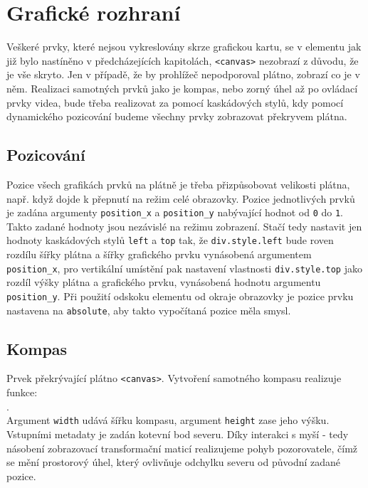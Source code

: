 \section{Grafické rozhraní}
Veškeré prvky, které nejsou vykreslovány skrze grafickou kartu, se v elementu jak již bylo nastíněno v předcházejících kapitolách, \texttt{<canvas>} nezobrazí z důvodu, že je vše skryto. Jen v případě, že by prohlížeč nepodporoval plátno, zobrazí co je v něm. Realizaci samotných prvků jako je kompas, nebo zorný úhel až po ovládací prvky videa, bude třeba realizovat za pomocí kaskádových stylů, kdy pomocí dynamického pozicování budeme všechny prvky zobrazovat překryvem plátna.

\subsection*{Pozicování}
Pozice všech grafikách prvků na plátně je třeba přizpůsobovat velikosti plátna, např. když dojde k přepnutí na režim celé obrazovky. Pozice jednotlivých prvků je zadána argumenty \texttt{position\_x} a \texttt{position\_y} nabývající hodnot od \texttt{0} do \texttt{1}. Takto zadané hodnoty jsou nezávislé na režimu zobrazení. Stačí tedy nastavit jen hodnoty kaskádových stylů \texttt{left} a \texttt{top} tak, že \texttt{div.style.left} bude roven rozdílu šířky plátna a šířky grafického prvku vynásobená argumentem \texttt{position\_x}, pro vertikální umístění pak nastavení vlastnosti \texttt{div.style.top} jako rozdíl výšky plátna a grafického prvku, vynásobená  hodnotu argumentu \texttt{position\_y}. Při použití odskoku elementu od okraje obrazovky je pozice prvku nastavena na \texttt{absolute}, aby takto vypočítaná pozice měla smysl. 

\newpage

\subsection{Kompas}
Prvek překrývající plátno \texttt{<canvas>}. Vytvoření samotného kompasu realizuje funkce: \\\texttt{\createCompassFull}.\\ Argument \texttt{width} udává šířku kompasu, argument \texttt{height} zase jeho výšku. Vstupními metadaty je zadán kotevní bod severu. Díky interakci s myší - tedy násobení zobrazovací transformační maticí realizujeme pohyb pozorovatele, čímž se mění prostorový úhel, který ovlivňuje odchylku severu  od původní zadané pozice.

